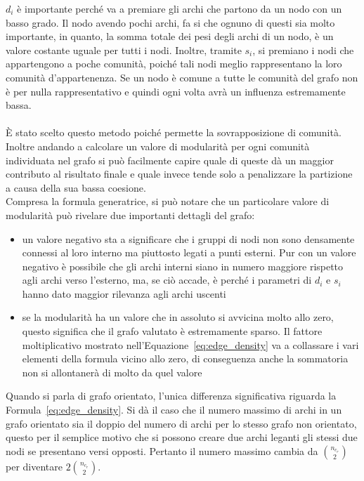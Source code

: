 $d_i$ è importante perché va a premiare gli archi che partono da un nodo con un basso grado. Il nodo avendo pochi archi, fa si che ognuno di questi sia molto importante, in quanto, la somma totale dei pesi degli archi di un nodo, è un valore costante uguale per tutti i nodi. Inoltre, tramite $s_i$, si premiano i nodi che appartengono a poche comunità, poiché tali nodi meglio rappresentano la loro comunità d'appartenenza. Se un nodo è comune a tutte le comunità del grafo non è per nulla rappresentativo e quindi ogni volta avrà un influenza estremamente bassa.\\
\\
È stato scelto questo metodo poiché permette la sovrapposizione di comunità. Inoltre andando a calcolare un valore di modularità per ogni comunità individuata nel grafo si può facilmente capire quale di queste dà un maggior contributo al risultato finale e quale invece tende solo a penalizzare la partizione a causa della sua bassa coesione.\\
Compresa la formula generatrice, si può notare che un particolare valore di modularità può rivelare  due importanti dettagli del grafo:
\begin{itemize}
	\item un valore negativo sta a significare che i gruppi di nodi non sono densamente connessi al loro interno ma piuttosto legati a punti esterni. Pur con un valore negativo è possibile che gli archi interni siano in numero maggiore rispetto agli archi verso l'esterno, ma, se ciò accade, è perché i parametri di $d_i$ e $s_i$ hanno dato maggior rilevanza agli archi uscenti
	\item se la modularità ha un valore che in assoluto si avvicina molto allo zero, questo significa che il grafo valutato è estremamente sparso. Il fattore moltiplicativo mostrato nell'Equazione~\ref{eq:edge_density} va a collassare i vari elementi della formula vicino allo zero, di conseguenza anche la sommatoria non si allontanerà di molto da quel valore
\end{itemize}
Quando si parla di grafo orientato, l'unica differenza significativa riguarda la Formula~\ref{eq:edge_density}. Si dà il caso che il numero massimo di archi in un grafo orientato sia il doppio del numero di archi per lo stesso grafo non orientato, questo per il semplice motivo che si possono creare due archi leganti gli stessi due nodi se presentano versi opposti. Pertanto il numero massimo cambia da $\binom{n_{c_r}}{2}$ per diventare $ 2\binom{n_{c_r}}{2}$.
%
%
